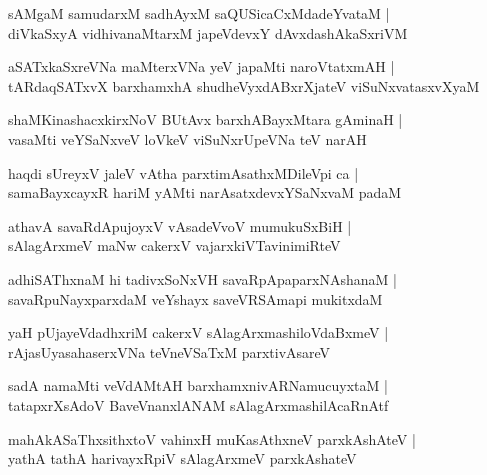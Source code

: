 \documentclass[twoside,12pt,openright]{book}
\newcounter{shloka}[chapter]
\begin{document}
\begin{shloka}
sAMgaM samudarxM sadhAyxM saQUSicaCxMdadeYvataM |\\
diVkaSxyA vidhivanaMtarxM japeVdevxY dAvxdashAkaSxriVM 
\end{shloka}

\begin{shloka}
aSATxkaSxreVNa maMterxVNa yeV japaMti naroVtatxmAH |\\
tARdaqSATxvX barxhamxhA shudheVyxdABxrXjateV viSuNxvatasxvXyaM 
\end{shloka}

\begin{shloka}
shaMKinashacxkirxNoV BUtAvx barxhABayxMtara gAminaH |\\
vasaMti veYSaNxveV loVkeV viSuNxrUpeVNa teV narAH 
\end{shloka}

\begin{shloka}
haqdi sUreyxV jaleV vAtha parxtimAsathxMDileVpi ca |\\
samaBayxcayxR hariM yAMti narAsatxdevxYSaNxvaM padaM 
\end{shloka}

\begin{shloka}
athavA savaRdApujoyxV vAsadeVvoV mumukuSxBiH |\\
sAlagArxmeV maNw cakerxV vajarxkiVTavinimiRteV 
\end{shloka}

\begin{shloka}
adhiSAThxnaM hi tadivxSoNxVH savaRpApaparxNAshanaM |\\
savaRpuNayxparxdaM veYshayx saveVRSAmapi mukitxdaM 
\end{shloka}

\begin{shloka}
yaH pUjayeVdadhxriM cakerxV sAlagArxmashiloVdaBxmeV |\\
rAjasUyasahaserxVNa teVneVSaTxM parxtivAsareV 
\end{shloka}

\begin{shloka}
sadA namaMti veVdAMtAH barxhamxnivARNamucuyxtaM |\\
tatapxrXsAdoV BaveVnanxlANAM sAlagArxmashilAcaRnAtf
\end{shloka}

\begin{shloka}
mahAkASaThxsithxtoV vahinxH muKasAthxneV parxkAshAteV |\\
yathA tathA harivayxRpiV sAlagArxmeV parxkAshateV 
\end{shloka}
\end{document}
